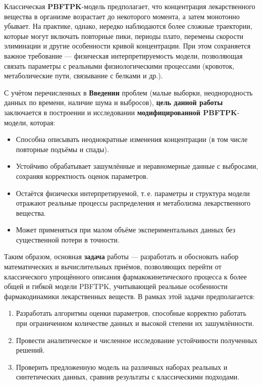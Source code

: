 \documentclass[12pt]{article}
\begin{document}
Классическая \textbf{PBFTPK}-модель предполагает, что концентрация лекарственного вещества в организме возрастает до некоторого момента, а затем монотонно убывает. На практике, однако, нередко наблюдаются более сложные траектории, которые могут включать повторные пики, периоды плато, перемены скорости элиминации и другие особенности кривой концентрации. При этом сохраняется важное требование --- физическая интерпретируемость модели, позволяющая связать параметры с реальными физиологическими процессами (кровоток, метаболические пути, связывание с белками и др.).

С учётом перечисленных в \textbf{Введении} проблем (малые выборки, неоднородность данных по времени, наличие шума и выбросов), \textbf{цель данной работы} заключается в построении и исследовании \textbf{модифицированной PBFTPK}-модели, которая:

\begin{itemize}
	\item Способна описывать неоднократные изменения концентрации (в том числе повторные подъёмы и спады).
	\item Устойчиво обрабатывает зашумлённые и неравномерные данные с выбросами, сохраняя корректность оценок параметров.
	\item Остаётся физически интерпретируемой, т.\,е. параметры и структура модели отражают реальные процессы распределения и метаболизма лекарственного вещества.
	\item Может применяться при малом объёме экспериментальных данных без существенной потери в точности.
\end{itemize}

Таким образом, основная \textbf{задача} работы --- разработать и обосновать набор математических и вычислительных приёмов, позволяющих перейти от классического упрощённого описания фармакокинетического процесса к более общей и гибкой модели PBFTPK, учитывающей реальные особенности фармакодинамики лекарственных веществ. В рамках этой задачи предполагается:

\begin{enumerate}
	\item Разработать алгоритмы оценки параметров, способные корректно работать при ограниченном количестве данных и высокой степени их зашумлённости.
	\item Провести аналитическое и численное исследование устойчивости полученных решений.
	\item Проверить предложенную модель на различных наборах реальных и синтетических данных, сравнив результаты с классическими подходами.
\end{enumerate}
\end{document}
